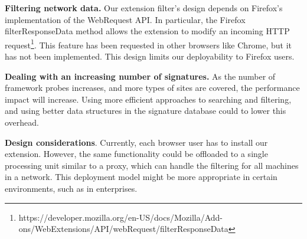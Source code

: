 
\textbf{Filtering network data.} Our extension filter's design depends
on Firefox's implementation of the WebRequest API. In particular, the
Firefox filterResponseData method allows the extension to modify an incoming
HTTP request\footnote{https://developer.mozilla.org/en-US/docs/Mozilla/Add-ons/WebExtensions/API/webRequest/filterResponseData}.
This feature has been requested in other browsers like
Chrome, but it has not been implemented. This design limits our deployability to Firefox users.

\textbf{Dealing with an increasing number of signatures.} As the number of framework probes increases, and more types of sites are covered, the performance impact will increase. Using more efficient approaches to searching and filtering, and using better data structures in the signature database could to lower this overhead.


\textbf{Design considerations}. Currently, each browser user has to install our extension. However, the same functionality could be offloaded to a single processing unit similar to a proxy, which can handle the filtering for all machines in a network. This deployment model might be more appropriate in certain environments, such as in enterprises.


